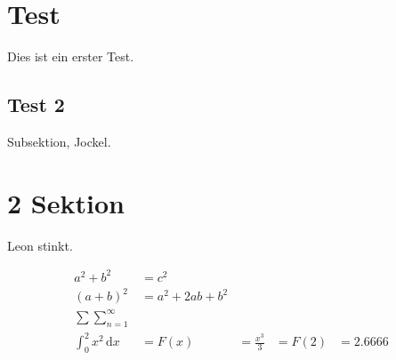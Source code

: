\section{Test}
Dies ist ein erster Test.

\subsection{Test 2}
Subsektion, Jockel.

\section{2 Sektion}
Leon stinkt.

\begin{align}
    a^2+b^2&=c^2    \\
    (a+b)^2&=a^2+2ab+b^2    \\
    \sum \sum_{n = 1}^{\infty} \\
\int_{0}^{2} x^2 \,\mathrm{d}x &= F(x) &= \frac{x^3}{3} &= F(2) &= 2.6666
\end{align}